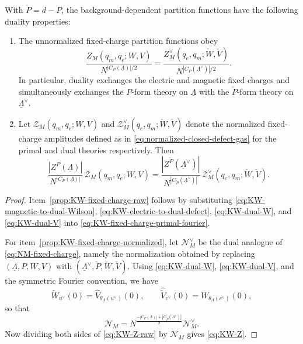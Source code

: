 \begin{prop}
	\label{prop:KW-fixed-charge-duality}
	With \(\check P=d-P\), the background-dependent partition functions have the following duality properties:
	\begin{enumerate}[label=(\roman*)]
		\item\label{prop:KW-fixed-charge-raw}
		The unnormalized fixed-charge partition functions obey
		\begin{equation}
			\frac{Z_M(q_m,q_e;W,V)}{N^{|C_P(\underline\Lambda)|/2}}
			= \frac{Z_M^\vee(q_e,q_m;\check W,\check V)}{N^{|C_{\check P}(\underline\Lambda^\vee)|/2}}.
			\label{eq:KW-Z-raw}
		\end{equation}
		In particular, duality exchanges the electric and magnetic fixed charges and
		simultaneously exchanges the \(P\)-form theory on \(\underline\Lambda\) with the
		\(\check P\)-form theory on \(\underline\Lambda^\vee\).
		
		\item\label{prop:KW-fixed-charge-normalized}
		Let \(\mathcal Z_M(q_m,q_e;W,V)\) and
		\(\mathcal Z_M^\vee(q_e,q_m;\check W,\check V)\) denote the normalized
		fixed-charge amplitudes defined as in \eqref{eq:normalized-closed-defect-gas} for
		the primal and dual theories respectively. Then
		\begin{equation}
			\frac{|Z^P(\underline\Lambda)|}{N^{|C_P(\underline\Lambda)|}}\,
			\mathcal Z_M(q_m,q_e;W,V)
			=
			\frac{|Z^{\check P}(\underline\Lambda^\vee)|}
			{N^{|C_{\check P}(\underline\Lambda^\vee)|}}\,
			\mathcal Z_M^\vee(q_e,q_m;\check W,\check V).
			\label{eq:KW-Z}
		\end{equation}
	\end{enumerate}
\end{prop}

\begin{proof}
	Item~\ref{prop:KW-fixed-charge-raw} follows by substituting
	\eqref{eq:KW-magnetic-to-dual-Wilson},
	\eqref{eq:KW-electric-to-dual-defect}, \eqref{eq:KW-dual-W}, and
	\eqref{eq:KW-dual-V} into \eqref{eq:KW-fixed-charge-primal-fourier}.
	
	For item~\ref{prop:KW-fixed-charge-normalized}, let \(\mathcal N_M^\vee\) be the
	dual analogue of \eqref{eq:NM-fixed-charge}, namely the normalization obtained by
	replacing \((\underline\Lambda,P,W,V)\) with
	\((\underline\Lambda^\vee,\check P,\check W,\check V)\). Using
	\eqref{eq:KW-dual-W}, \eqref{eq:KW-dual-V}, and the symmetric Fourier convention,
	we have
	\begin{equation}
		\check W_{u^\vee}(0)=\widehat V_{\theta_{\underline\Lambda}(u^\vee)}(0),
		\qquad
		\widehat{\check V}_{c^\vee}(0)=W_{\theta_{\underline\Lambda}(c^\vee)}(0),
	\end{equation}
	so that
	\begin{equation}
		\mathcal N_M
		=
		N^{\frac{-|C_P(\underline\Lambda)|+|C_{\check P}(\underline\Lambda^\vee)|}{2}}
		\mathcal N_M^\vee.
		\label{eq:Ndual}
	\end{equation}
	Now dividing both sides of \eqref{eq:KW-Z-raw} by \(\mathcal N_M\) gives \eqref{eq:KW-Z}.
\end{proof}






